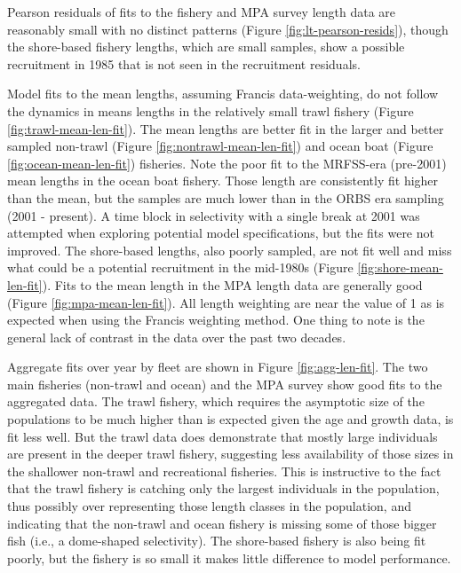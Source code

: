 \documentclass[11pt,
  letterpaper,
]{article}
\begin{document}
Pearson residuals of fits to the fishery and MPA survey length data are reasonably small with no distinct patterns (Figure \ref{fig:lt-pearson-resids}), though the shore-based fishery lengths, which are small samples, show a possible recruitment in 1985 that is not seen in the recruitment residuals.

Model fits to the mean lengths, assuming Francis data-weighting, do not follow the dynamics in means lengths in the relatively small trawl fishery (Figure \ref{fig:trawl-mean-len-fit}). The mean lengths are better fit in the larger and better sampled non-trawl (Figure \ref{fig:nontrawl-mean-len-fit}) and ocean boat (Figure \ref{fig:ocean-mean-len-fit}) fisheries. Note the poor fit to the MRFSS-era (pre-2001) mean lengths in the ocean boat fishery. Those length are consistently fit higher than the mean, but the samples are much lower than in the ORBS era sampling (2001 - present). A time block in selectivity with a single break at 2001 was attempted when exploring potential model specifications, but the fits were not improved. The shore-based lengths, also poorly sampled, are not fit well and miss what could be a potential recruitment in the mid-1980s (Figure \ref{fig:shore-mean-len-fit}). Fits to the mean length in the MPA length data are generally good (Figure \ref{fig:mpa-mean-len-fit}). All length weighting are near the value of 1 as is expected when using the Francis weighting method. One thing to note is the general lack of contrast in the data over the past two decades.

Aggregate fits over year by fleet are shown in Figure \ref{fig:agg-len-fit}. The two main fisheries (non-trawl and ocean) and the MPA survey show good fits to the aggregated data. The trawl fishery, which requires the asymptotic size of the populations to be much higher than is expected given the age and growth data, is fit less well. But the trawl data does demonstrate that mostly large individuals are present in the deeper trawl fishery, suggesting less availability of those sizes in the shallower non-trawl and recreational fisheries. This is instructive to the fact that the trawl fishery is catching only the largest individuals in the population, thus possibly over representing those length classes in the population, and indicating that the non-trawl and ocean fishery is missing some of those bigger fish (i.e., a dome-shaped selectivity). The shore-based fishery is also being fit poorly, but the fishery is so small it makes little difference to model performance.
\end{document}
